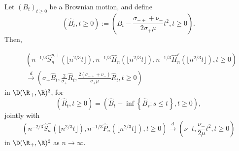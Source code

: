 \begin{lemma}\label{lemma.heightprocesswithlengths}
Let $(B_t)_{t\geq 0}$ be a Brownian motion, and define
$$(\hat{B}_t,t\geq 0):=\left( B_t-\frac{\sigma_{-+}+\nu_-}{2\sigma_+ \mu}t^2, t\geq 0\right).$$ Then,

\begin{align*}&\left(n^{-1/3}\hat{S}^{p,+}_n\left(\lfloor n^{2/3}t\rfloor \right),n^{-1/3}\hat{H}_{n}\left(\lfloor n^{2/3}t\rfloor \right),n^{-1/3}\hat{H}^\ell_{n}\left(\lfloor n^{2/3}t\rfloor \right),  t\geq 0\right)\\
&\overset{d}{\to}\left(\sigma_+ \hat{B}_t, \frac{2}{\sigma_+} \hat{R}_t,\frac{2(\sigma_{-+}+\nu_-)}{\sigma_+\mu} \hat{R}_t, t\geq 0\right)\end{align*}
in $\D(\R_+,\R)^3$, for 
$$(\hat{R}_t,t\geq 0)=\left(\hat{B}_t-\inf\left\{\hat{B}_s: s\leq t\right\},t\geq 0\right),$$
jointly with 
$$\left(n^{-2/3}\hat{S}_n^-\left(\lfloor n^{2/3}t\rfloor \right), n^{-1/3}\hat{P}_n\left(\lfloor n^{2/3}t\rfloor \right),t\geq 0\right)\overset{d}{\to}\left(\nu_-t,  \frac{\nu_-}{2\mu} t^2, t\geq 0\right)$$
in $\D(\R_+,\R)^2$ as $n\to \infty$.
\end{lemma}

